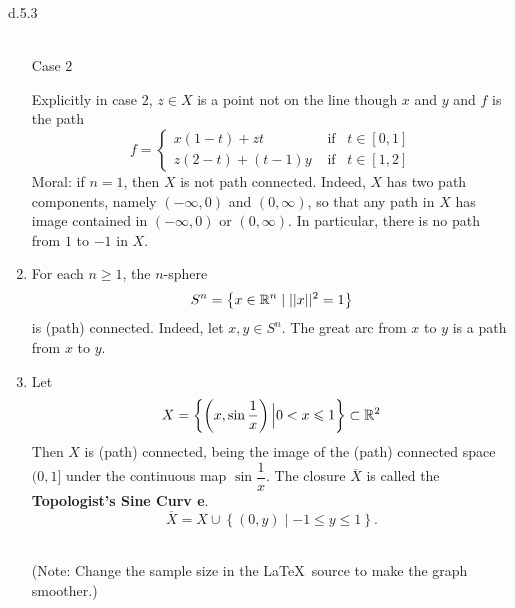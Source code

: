 \begin{customexa}{d.5.3}
\begin{enumerate}
\begin{minipage}{0.5\textwidth}
\begin{center}
\\
        Case $2$
        \end{center}
    \end{minipage}
    Explicitly in case $2$, $z \in X$ is a point not on the line though $x$ and $y$ and $f$ is the path
    $$f = \begin{cases} x(1-t) + zt &\text{ if }\,\,\, t \in [0,1]\\
    z(2-t) + (t-1)y & \text{ if }\,\,\,
t \in [1, 2]
    \end{cases}$$
    Moral: if $n = 1$, then $X$ is not path connected. Indeed, $X$ has two path components, namely $(-\infty, 0)$ and $(0, \infty)$, so that any path in $X$ has image contained in $(-\infty, 0)$ or $(0, \infty)$. In particular, there is no path from $1$ to $-1$ in $X$.
\item[3).] For each $n \geqslant 1$, the $n$-sphere
    $$S^n = \left\{x \in \mathbb{R}^n \mid ||x||^2 = 1\right\}$$
is (path) connected. Indeed, let $x, y \in S^n$. The great arc from $x$ to $y$ is a path from $x$ to $y$.
\item[4).] Let 
    $$X = \left\{\left(x, \sin{\dfrac{1}{x}}\right)\Big| 0 < x \leqslant 1\right\} \subset \mathbb{R}^2$$
    Then $X$ is (path) connected, being the image of the (path) connected space $(0, 1]$ under the continuous map $\sin{\dfrac{1}{x}}$. The closure $\overline{X}$ is called the {\bf Topologist's Sine Curv e}.
    $$\overline{X} = X \cup \left\{(0, y) \mid -1 \leqslant y \leqslant 1\right\}.$$
    \begin{center}
        \hspace{0.2cm}
    \\
    (Note: Change the sample size in the \LaTeX\, source to make the graph smoother.)

\end{center}
\end{enumerate}
\end{customexa}
